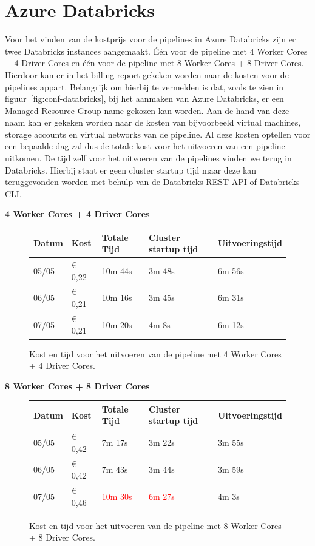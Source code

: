 \section{Azure Databricks}

Voor het vinden van de kostprijs voor de pipelines in Azure Databricks zijn er twee Databricks instances aangemaakt. Één voor de pipeline met 4 Worker Cores + 4 Driver Cores en één voor de pipeline met 8 Worker Cores + 8 Driver Cores. Hierdoor kan er in het billing report gekeken worden naar de kosten voor de pipelines appart. Belangrijk om hierbij te vermelden is dat, zoals te zien in figuur~\ref{fig:conf-databricks}, bij het aanmaken van Azure Databricks, er een Managed Resource Group name gekozen kan worden. Aan de hand van deze naam kan er gekeken worden naar de kosten van bijvoorbeeld virtual machines, storage accounts en virtual networks van de pipeline. Al deze kosten optellen voor een bepaalde dag zal dus de totale kost voor het uitvoeren van een pipeline uitkomen. De tijd zelf voor het uitvoeren van de pipelines vinden we terug in Databricks. Hierbij staat er geen cluster startup tijd maar deze kan teruggevonden worden met behulp van de Databricks REST API of Databricks CLI.


\textbf{4 Worker Cores + 4 Driver Cores}

\begin{figure}[H]%
    \centering
    \begin{tabularx}{1\textwidth}{ |X|X|X|X|X| }
        \hline
        \textbf{Datum} & \textbf{Kost} & \textbf{Totale Tijd} & \textbf{Cluster startup tijd} & \textbf{Uitvoeringstijd} \\
        \hline 
        05/05 & € 0,22 & 10m 44s &  3m 48s & 6m 56s \\
        \hline
        06/05 & € 0,21 & 10m 16s & 3m 45s & 6m 31s \\
        \hline
        07/05 & € 0,21 & 10m 20s & 4m 8s & 6m 12s \\
        \hline
    \end{tabularx}
    \caption{Kost en tijd voor het uitvoeren van de pipeline met 4 Worker Cores + 4 Driver Cores.}
\end{figure}

\textbf{8 Worker Cores + 8 Driver Cores}

\begin{figure}[H]%
    \centering
    \begin{tabularx}{1\textwidth}{ |X|X|X|X|X| }
        \hline
        \textbf{Datum} & \textbf{Kost} & \textbf{Totale Tijd} & \textbf{Cluster startup tijd} & \textbf{Uitvoeringstijd} \\
        \hline 
        05/05 & € 0,42 & 7m 17s & 3m 22s & 3m 55s \\
        \hline
        06/05 & € 0,42 & 7m 43s & 3m 44s & 3m 59s \\
        \hline
        07/05 & € 0,46 & \textcolor{red}{10m 30s} & \textcolor{red}{6m 27s} & 4m 3s \\
        \hline
    \end{tabularx}
    \caption{Kost en tijd voor het uitvoeren van de pipeline met 8 Worker Cores + 8 Driver Cores.}
\end{figure}


